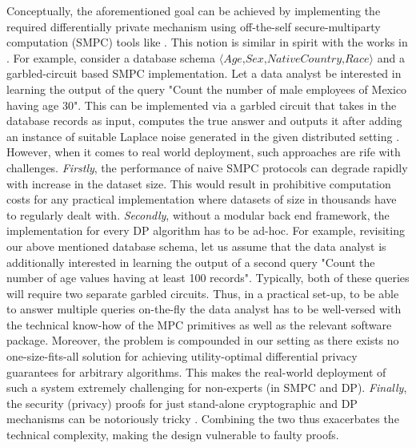 Conceptually, the aforementioned goal can be achieved by implementing the required differentially private mechanism using off-the-self secure-multiparty computation (SMPC) tools like \cite{EMP,MPCtools,ScaleMAMBA,ABY}. This notion is similar in spirit with the works in \cite{DworkOurData,BeimelSFE+DP}. For example, consider a database schema  $\langle\textit{Age,Sex,NativeCountry,Race}\rangle$ and a garbled-circuit based SMPC implementation. Let a data analyst be interested in learning the output of the query "Count the number of male employees of Mexico having age 30". This can be implemented via a garbled circuit that takes in the database records as input, computes the true answer and outputs it after adding an instance of suitable Laplace noise generated in the given distributed setting \cite{DworkOurData}. However, when it comes to real world deployment, such approaches are rife with challenges. \textit{Firstly}, the performance of naive SMPC protocols can degrade rapidly with increase in the dataset size. This would result in prohibitive computation costs for any practical implementation where datasets of size in thousands have to regularly dealt with. \textit{Secondly}, without a modular back end framework, the implementation for every DP algorithm has to be ad-hoc. For example, revisiting our above mentioned database schema, let us assume that the data analyst is additionally interested in learning the output of a second query "Count the number of age values having at least 100 records". Typically, both of these queries will require two separate garbled circuits. Thus, in a practical set-up, to be able to answer multiple queries on-the-fly the data analyst has to be well-versed with the technical know-how of the MPC primitives as well as the relevant software package. Moreover, the problem is compounded in our setting as there exists no one-size-fits-all solution for achieving utility-optimal differential privacy guarantees for arbitrary algorithms. This makes the real-world deployment of  such a system extremely challenging for non-experts (in SMPC and DP). \textit{Finally}, the security (privacy) proofs for just stand-alone cryptographic and DP mechanisms can be notoriously tricky \cite{BellareCryptoError,DPSVTProof}. Combining the two thus exacerbates the technical complexity, making the design vulnerable to faulty proofs.
 
